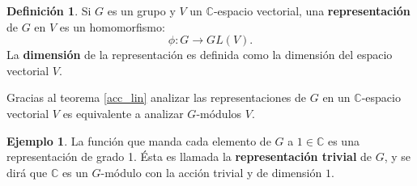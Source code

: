\documentclass[12pt]{book}
\theoremstyle{definition}
\newtheorem{definition}[theorem]{Definición}
\newtheorem{example}[theorem]{Ejemplo}
\newcounter{in}
\newcounter{ini}
\begin{document}
\begin{definition}
  \label{representation}
  Si $G$ es un grupo y $V$ un $\mathbb{C}$-espacio vectorial, una
  \textbf{representación} de $G$ en $V$ es un homomorfismo:
  $$\phi \colon G \to GL(V).$$
  La \textbf{dimensión} de la representación es
  definida como la dimensión del espacio vectorial $V$.
\end{definition}
Gracias al teorema \ref{acc_lin} analizar las representaciones de $G$
en un $\mathbb{C}$-espacio vectorial $V$ es equivalente a analizar
$G$-módulos $V$.
\begin{example}
  \label{Ej6}
  La función que manda cada elemento de $G$ a $1 \in \mathbb{C}$ es
  una representación de grado 1. Ésta es llamada la
  \textbf{representación trivial} de $G$, y se dirá que $\mathbb{C}$
  es un $G$-módulo con la acción trivial y de dimensión $1$.
\end{example}  
  
\end{document}
